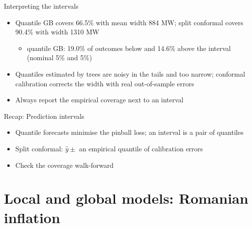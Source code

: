 \begin{frame}{Interpreting the intervals}
\itemsize{\small}
\begin{itemize}
    \item Quantile GB covers 66.5\% with mean width 884 MW; split conformal covers 90.4\% with width 1310 MW
    \begin{itemize}
        \item quantile GB: 19.0\% of outcomes below and 14.6\% above the interval (nominal 5\% and 5\%)
    \end{itemize}
    \item Quantiles estimated by trees are noisy in the tails and too narrow; conformal calibration corrects the width with real out-of-sample errors
    \item Always report the empirical coverage next to an interval
\end{itemize}
\end{frame}

\begin{frame}{Recap: Prediction intervals}
\itemsize{\small}
\begin{itemize}
    \item Quantile forecasts minimise the pinball loss; an interval is a pair of quantiles
    \item Split conformal: $\hat y \pm$ an empirical quantile of calibration errors
    \item Check the coverage walk-forward
\end{itemize}
\end{frame}


\section{Local and global models: Romanian inflation}

